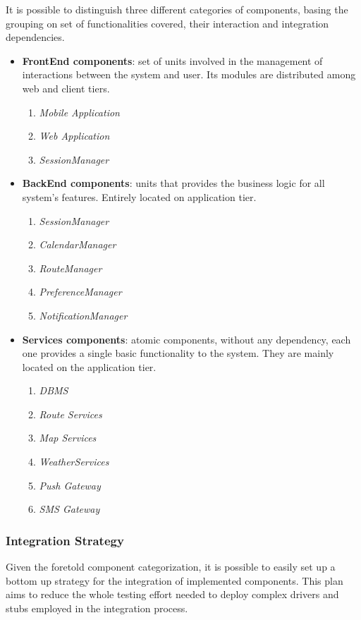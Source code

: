 It is possible to distinguish three different categories of components, basing the grouping on set of functionalities covered, their interaction and integration dependencies.
\vspace{0.3cm}
\begin{itemize}
	\item \textbf{FrontEnd components}: set of units involved in the management of interactions between the system and user. Its modules are distributed among web and client tiers.
	\begin{enumerate}
		\item \textit{Mobile Application}
		\item \textit{Web Application}
		\item \textit{SessionManager}
	\end{enumerate}
	\item \textbf{BackEnd components}: units that provides the business logic for all system's features. Entirely located on application tier.
	\begin{enumerate}
		\item \textit{SessionManager}
		\item \textit{CalendarManager}
		\item \textit{RouteManager}
		\item \textit{PreferenceManager}
		\item \textit{NotificationManager}
	\end{enumerate}
	\item \textbf{Services components}: atomic components, without any dependency, each one provides a single basic functionality to the system. They are mainly located on the application tier.
	\begin{enumerate}
		\item \textit{DBMS}
		\item \textit{Route Services}
		\item \textit{Map Services}
		\item \textit{WeatherServices}
		\item \textit{Push Gateway}
		\item \textit{SMS Gateway}
	\end{enumerate}
\end{itemize}
\subsubsection{Integration Strategy}

Given the foretold component categorization, it is possible to easily set up a bottom up strategy for the integration of implemented components. This plan aims to reduce the whole testing effort needed to deploy complex drivers and stubs employed in the integration process.

